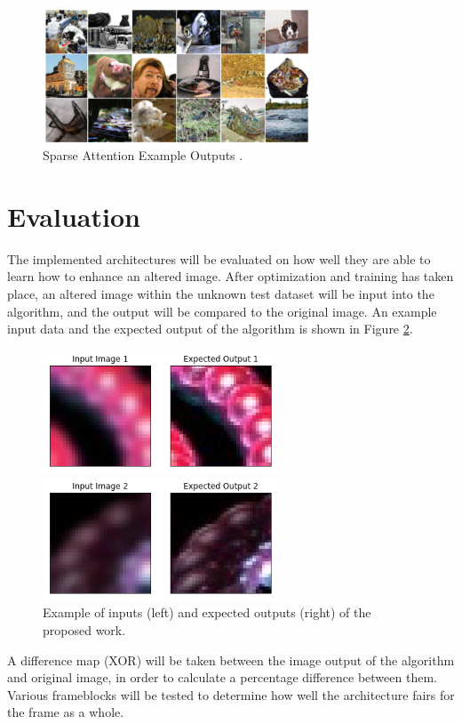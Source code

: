 \documentclass[letterpaper]{article} %
\begin{document}
\begin{figure}[htbp]
\centerline{\includegraphics[width=8cm]{sparse_attention.png}}
\caption{Sparse Attention Example Outputs \cite{generative_transformers}.}
\label{fig:sparse_attention}
\end{figure}

\section{Evaluation}
\label{sec:methods/evaluation}
The implemented architectures will be evaluated on how well they are able to learn how to
enhance an altered image. After optimization and training has taken place,
an altered image within the unknown test dataset will be input into the algorithm, and the output
will be compared to the original image. An example input data and the expected output
of the algorithm is shown in Figure \ref{fig:training_pair}.

\begin{figure}[htbp]
\centerline{\includegraphics[width=7cm]{training_pair_1.png}}
\centerline{\includegraphics[width=7cm]{training_pair_2.png}}
\caption{Example of inputs (left) and expected outputs (right) of the proposed work.}
\label{fig:training_pair}
\end{figure}

A difference map (XOR) will be taken between the image output of the algorithm
and original image, in order to calculate a percentage difference between them.
Various frameblocks will be tested to determine how well the architecture fairs for the frame
as a whole.
\end{document}

